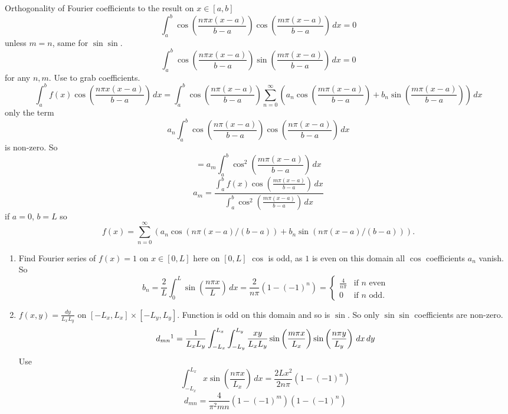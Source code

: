 \documentclass[10pt, a4paper]{article}
\begin{document}
Orthogonality of Fourier coefficients to the result on $x \in [a, b]$
\[
\int_{a}^{b}\cos\left(\frac{n\pi x(x - a)}{b - a}\right)\cos\left(\frac{m\pi(x - a)}{b - a}\right)\,dx = 0
\]
unless $m = n$,
same for $\sin\sin$.
\[
\int_{a}^{b}\cos\left(\frac{n\pi x(x - a)}{b - a}\right)\sin\left(\frac{m\pi(x - a)}{b - a}\right)\,dx = 0
\]
for any $n, m$.
Use to grab coefficients.
\[
\int_{a}^{b}f(x)\cos\left(\frac{n\pi x(x - a)}{b - a}\right)\,dx = \int_{a}^{b}\cos\left(\frac{n\pi(x - a)}{b - a}\right)\sum_{n = 0}^{\infty}\left(a_n\cos\left(\frac{m\pi(x - a)}{b - a}\right) + b_n\sin\left(\frac{m\pi(x - a)}{b - a}\right)\right)\,dx
\]
only the term
\[
a_n\int_{a}^{b}\cos\left(\frac{n\pi(x - a)}{b - a}\right)\cos\left(\frac{n\pi(x - a)}{b - a}\right)\,dx
\]
is non-zero.
So
\[
= a_m\int_{a}^{b}\cos ^ 2\left(\frac{m\pi(x - a)}{b - a}\right)\,dx
\]
\[
a_m = \frac{\int_{a}^{b}f(x)\cos\left(\frac{m\pi(x - a)}{b - a}\right)\,dx}{\int_{a}^{b}\cos ^ 2\left(\frac{m\pi(x - a)}{b - a}\right)\,dx}
\]
if $a = 0$,
$b = L$ so
\[
f(x) = \sum_{n = 0}^{\infty}(a_n\cos(n\pi(x - a) / (b - a)) + b_n\sin(n\pi(x - a) / (b - a))).
\]

\begin{example}
    \begin{enumerate}[label = (\alph*)]
        \item Find Fourier series of $f(x) = 1$ on $x \in [0, L]$
        here on $[0, L]$ $\cos$ is odd,
        as $1$ is even on this domain all $\cos$ coefficients $a_n$ vanish.
        So
        \[
        b_n = \frac{2}{L}\int_{0}^{L}\sin\left(\frac{n\pi x}{L}\right)\,dx = \frac{2}{n\pi}(1 - (-1) ^ n) = \begin{cases}
            \frac{4}{n\pi} &\text{if $n$ even} \\
            0 &\text{if $n$ odd}.
        \end{cases}
        \]

        \item $f(x, y) = \frac{dy}{L_xL_y}$ on $[-L_x, L_x] \times [-L_y, L_y]$.
        Function is odd on this domain and so is $\sin$.
        So only $\sin\sin$ coefficients are non-zero.
        \[
        d_{mn}\footnotemark = \frac{1}{L_xL_y}\int_{-L_x}^{L_x}\int_{-L_y}^{L_y}\frac{xy}{L_xL_y}\sin\left(\frac{m\pi x}{L_x}\right)\sin\left(\frac{n\pi y}{L_y}\right)\,dx\,dy
        \]
        Use
        \[
        \int_{-L_x}^{L_x}x\sin\left(\frac{n\pi x}{L_x}\right)\,dx = \frac{2Lx ^ 2}{2n\pi}(1 - (-1) ^ n)
        \]
        \[
        d_{mn} = \frac{4}{\pi ^ 2mn}(1 - (-1) ^ m)(1 - (-1) ^ n)
        \]
    \end{enumerate}
\end{example}
\end{document}

